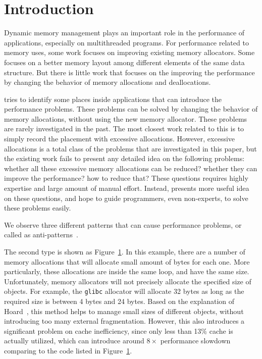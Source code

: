 \section{Introduction}

Dynamic memory management plays an important role in the performance of applications, especially on multithreaded programs. 
For performance related to memory uses, some work focuses on improving existing memory allocators. Some focuses on a better memory layout among different elements of the same data structure. 
But there is little work that focuses on the improving the performance by changing the behavior of memory allocations and deallocations. 

\HeapPerf{} tries to identify some places inside applications that can introduce the performance problems. These problems can be solved by changing the behavior of memory allocations, without using the new memory allocator. 
These problems are rarely investigated in the past. The most closest work related to this is to simply record the placement with excessive allocations. However, excessive allocations is a total class of the problems that are investigated in this paper, but the existing work fails to present any detailed idea on the following problems: whether all these excessive memory allocations can be reduced? whether they can improve the performance? how to reduce that? These questions requires highly expertise and large amount of manual effort. Instead, \HeapPerf{} presents more useful idea on these questions, and hope to guide programmers, even non-experts, to solve these problems easily. 

We observe three different patterns that can cause performance problems, or called as anti-patterns~\cite{}. 

The second type is shown as Figure~\ref{}. In this example, there are a number of memory allocations that will allocate small amount of bytes for each one. More particularly, these allocations are inside the same loop, and have the same size. Unfortunately, memory allocators will not precisely allocate the specified size of objects. For example, the \texttt{glibc} allocator will allocate 32 bytes as long as the required size is between 4 bytes and 24 bytes. Based on the explanation of Hoard~\cite{Hoard}, this method helps to manage small sizes of different objects, without introducing too many external fragmentation. However, this also introduces a significant problem on cache inefficiency, since only less than 13\% cache is actually utilized, which can introduce around $8\times$ performance slowdown comparing to the code listed in Figure~\ref{}. 


